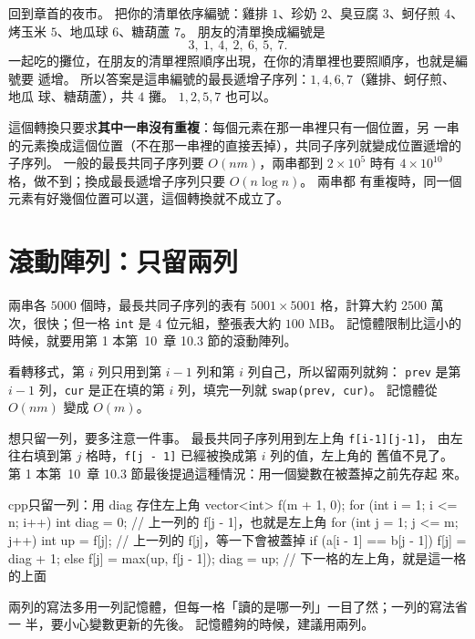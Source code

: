 回到章首的夜市。 把你的清單依序編號：雞排 $1$、珍奶 $2$、臭豆腐 $3$、蚵仔煎
$4$、烤玉米 $5$、地瓜球 $6$、糖葫蘆 $7$。 朋友的清單換成編號是
\[
3,\ 1,\ 4,\ 2,\ 6,\ 5,\ 7.
\]
一起吃的攤位，在朋友的清單裡照順序出現，在你的清單裡也要照順序，也就是編號要
遞增。 所以答案是這串編號的最長遞增子序列：$1, 4, 6, 7$（雞排、蚵仔煎、地瓜
球、糖葫蘆），共 $4$ 攤。 $1, 2, 5, 7$ 也可以。

這個轉換只要求\textbf{其中一串沒有重複}：每個元素在那一串裡只有一個位置，另
一串的元素換成這個位置（不在那一串裡的直接丟掉），共同子序列就變成位置遞增的
子序列。 一般的最長共同子序列要 $O(nm)$，兩串都到 $2 \times 10^5$ 時有
$4 \times 10^{10}$ 格，做不到；換成最長遞增子序列只要 $O(n \log n)$。 兩串都
有重複時，同一個元素有好幾個位置可以選，這個轉換就不成立了。

\section{滾動陣列：只留兩列}
\label{sec:ss-rolling}

兩串各 $5000$ 個時，最長共同子序列的表有 $5001 \times 5001$ 格，計算大約
$2500$ 萬次，很快；但一格 \texttt{int} 是 $4$ 位元組，整張表大約 $100$ MB。
記憶體限制比這小的時候，就要用第 1 本第~10~章 10.3 節的滾動陣列。

看轉移式，第 $i$ 列只用到第 $i - 1$ 列和第 $i$ 列自己，所以留兩列就夠：
\texttt{prev} 是第 $i - 1$ 列，\texttt{cur} 是正在填的第 $i$ 列，填完一列就
\texttt{swap(prev, cur)}。 記憶體從 $O(nm)$ 變成 $O(m)$。

想只留一列，要多注意一件事。 最長共同子序列用到左上角 \texttt{f[i-1][j-1]}，
由左往右填到第 $j$ 格時，\texttt{f[j - 1]} 已經被換成第 $i$ 列的值，左上角的
舊值不見了。 第 1 本第~10~章 10.3 節最後提過這種情況：用一個變數在被蓋掉之前先存起
來。

\begin{code}{cpp}{只留一列：用 diag 存住左上角}
vector<int> f(m + 1, 0);
for (int i = 1; i <= n; i++) {
    int diag = 0;                 // 上一列的 f[j - 1]，也就是左上角
    for (int j = 1; j <= m; j++) {
        int up = f[j];            // 上一列的 f[j]，等一下會被蓋掉
        if (a[i - 1] == b[j - 1]) {
            f[j] = diag + 1;
        } else {
            f[j] = max(up, f[j - 1]);
        }
        diag = up;                // 下一格的左上角，就是這一格的上面
    }
}
\end{code}

兩列的寫法多用一列記憶體，但每一格「讀的是哪一列」一目了然；一列的寫法省一
半，要小心變數更新的先後。 記憶體夠的時候，建議用兩列。

